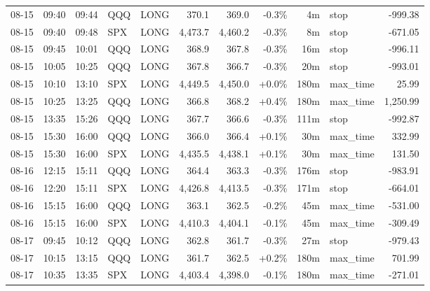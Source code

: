 \documentclass[11pt,a4paper,twoside]{article}
\begin{document}
\begin{center}
\begin{longtable}{>{\color{txtmain}}l l l l l r r r r >{\color{txtmain}}l r}
08-15 & 09:40 & 09:44 & QQQ & LONG & 370.1 & 369.0 & \textcolor{lossred}{-0.3\%} & 4m & stop & \textcolor{lossred}{-999.38} \\
08-15 & 09:40 & 09:48 & SPX & LONG & 4,473.7 & 4,460.2 & \textcolor{lossred}{-0.3\%} & 8m & stop & \textcolor{lossred}{-671.05} \\
08-15 & 09:45 & 10:01 & QQQ & LONG & 368.9 & 367.8 & \textcolor{lossred}{-0.3\%} & 16m & stop & \textcolor{lossred}{-996.11} \\
08-15 & 10:05 & 10:25 & QQQ & LONG & 367.8 & 366.7 & \textcolor{lossred}{-0.3\%} & 20m & stop & \textcolor{lossred}{-993.01} \\
08-15 & 10:10 & 13:10 & SPX & LONG & 4,449.5 & 4,450.0 & \textcolor{wingreen}{+0.0\%} & 180m & max\_time & \textcolor{wingreen}{25.99} \\
08-15 & 10:25 & 13:25 & QQQ & LONG & 366.8 & 368.2 & \textcolor{wingreen}{+0.4\%} & 180m & max\_time & \textcolor{wingreen}{1,250.99} \\
08-15 & 13:35 & 15:26 & QQQ & LONG & 367.7 & 366.6 & \textcolor{lossred}{-0.3\%} & 111m & stop & \textcolor{lossred}{-992.87} \\
08-15 & 15:30 & 16:00 & QQQ & LONG & 366.0 & 366.4 & \textcolor{wingreen}{+0.1\%} & 30m & max\_time & \textcolor{wingreen}{332.99} \\
08-15 & 15:30 & 16:00 & SPX & LONG & 4,435.5 & 4,438.1 & \textcolor{wingreen}{+0.1\%} & 30m & max\_time & \textcolor{wingreen}{131.50} \\
08-16 & 12:15 & 15:11 & QQQ & LONG & 364.4 & 363.3 & \textcolor{lossred}{-0.3\%} & 176m & stop & \textcolor{lossred}{-983.91} \\
08-16 & 12:20 & 15:11 & SPX & LONG & 4,426.8 & 4,413.5 & \textcolor{lossred}{-0.3\%} & 171m & stop & \textcolor{lossred}{-664.01} \\
08-16 & 15:15 & 16:00 & QQQ & LONG & 363.1 & 362.5 & \textcolor{lossred}{-0.2\%} & 45m & max\_time & \textcolor{lossred}{-531.00} \\
08-16 & 15:15 & 16:00 & SPX & LONG & 4,410.3 & 4,404.1 & \textcolor{lossred}{-0.1\%} & 45m & max\_time & \textcolor{lossred}{-309.49} \\
08-17 & 09:45 & 10:12 & QQQ & LONG & 362.8 & 361.7 & \textcolor{lossred}{-0.3\%} & 27m & stop & \textcolor{lossred}{-979.43} \\
08-17 & 10:15 & 13:15 & QQQ & LONG & 361.7 & 362.5 & \textcolor{wingreen}{+0.2\%} & 180m & max\_time & \textcolor{wingreen}{701.99} \\
08-17 & 10:35 & 13:35 & SPX & LONG & 4,403.4 & 4,398.0 & \textcolor{lossred}{-0.1\%} & 180m & max\_time & \textcolor{lossred}{-271.01} \\

\end{longtable}
\end{center}
\end{document}
